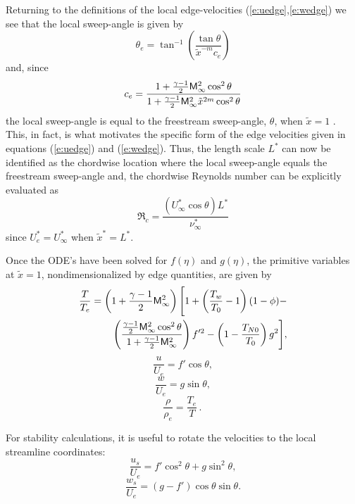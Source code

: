 Returning to the definitions of the local edge-velocities
(\ref{e:uedge},\ref{e:wedge}) we see that the local sweep-angle is given by
%
\begin{equation}
  \theta_e = \tan^{-1}\left( \frac{\tan\theta}
                                   {\tilde x^{-m} c_e} \right)
\end{equation}
%
and, since
%
\begin{equation}
  {c_e} = \frac{ 1 + \frac{\gamma-1}{2} {\sf M}^2_\infty \cos^2 \theta }
 	   { 1 + \frac{\gamma-1}{2} {\sf M}^2_\infty \tilde x^{2m} \cos^2 \theta } 
\end{equation}
%
the local sweep-angle is equal to the freestream sweep-angle, $\theta$, when
$\tilde x = 1$ .  This, in fact, is what motivates the specific form of the
edge velocities given in equations (\ref{e:uedge}) and (\ref{e:wedge}).  Thus,
the length scale $L^*$ can now be identified as the chordwise location where
the local sweep-angle equals the freestream sweep-angle and, the chordwise
Reynolds number can be explicitly evaluated as
%
\begin{equation}
  \Re_c = \frac{(U^*_\infty \cos\theta) L^*}{\nu^*_\infty}
\end{equation}
%
since $U^*_e = U^*_\infty$ when $\tilde x^* = L^*$.

Once the ODE's have been solved for $f(\eta)$ and $g(\eta)$, the primitive
variables at $\tilde x = 1$, nondimensionalized by edge quantities, are given
by
%
\begin{eqnarray}
  \frac{T}{T_e} = \left( 1 + \frac{\gamma-1}{2} {\sf M}^2_\infty \right) 
        \Bigg[ 1 + \left( \frac{T_w}{T_0} - 1 \right) (1 - \phi) - 
	\\ \nonumber
	\left(\frac{\frac{\gamma-1}{2} {\sf M}^2_\infty \cos^2\theta}
	     {1 + \frac{\gamma-1}{2} {\sf M}^2_\infty}\right) f'^2 -
	\left( 1 - \frac{T_{N0}}{T_0} \right) g^2 \Bigg] ,
\end{eqnarray}
%
\begin{equation}
  \frac{u}{U_e} = f' \cos\theta ,
\end{equation}
%
\begin{equation}
  \frac{w}{U_e} = g \sin\theta ,
\end{equation}
%
\begin{equation}
  \frac{\rho}{\rho_e} = \frac{T_e}{T} \period
\end{equation}

For stability calculations, it is useful to rotate the velocities to the local
streamline coordinates:
%
\begin{equation}
  \frac{u_s}{U_e} =  f' \cos^2\theta + g \sin^2\theta ,
\end{equation}
%
\begin{equation}
  \frac{w_s}{U_e} = (g - f') \cos\theta \sin\theta .
\end{equation}

